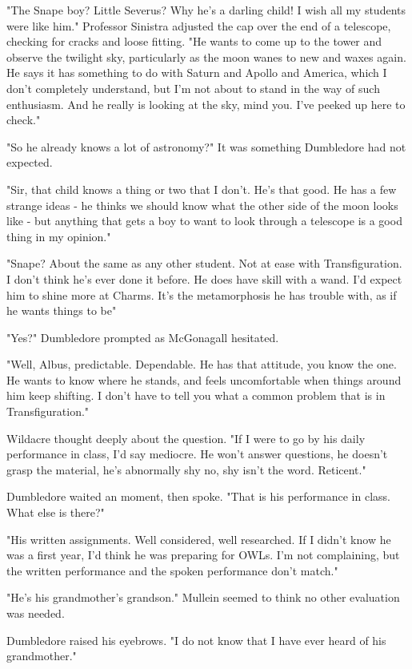 "The Snape boy? Little Severus? Why he's a darling child! I wish all my students were like him." Professor Sinistra adjusted the cap over the end of a telescope, checking for cracks and loose fitting. "He wants to come up to the tower and observe the twilight sky, particularly as the moon wanes to new and waxes again. He says it has something to do with Saturn and Apollo and America, which I don't completely understand, but I'm not about to stand in the way of such enthusiasm. And he really is looking at the sky, mind you. I've peeked up here to check."

"So he already knows a lot of astronomy?" It was something Dumbledore had not expected.

"Sir, that child knows a thing or two that I don't. He's that good. He has a few strange ideas - he thinks we should know what the other side of the moon looks like - but anything that gets a boy to want to look through a telescope is a good thing in my opinion."

"Snape? About the same as any other student. Not at ease with Transfiguration. I don't think he's ever done it before. He does have skill with a wand. I'd expect him to shine more at Charms. It's the metamorphosis he has trouble with, as if he wants things to be{\el}"

"Yes?" Dumbledore prompted as McGonagall hesitated.

"Well, Albus, predictable. Dependable. He has that attitude, you know the one. He wants to know where he stands, and feels uncomfortable when things around him keep shifting. I don't have to tell you what a common problem that is in Transfiguration."

Wildacre thought deeply about the question. "If I were to go by his daily performance in class, I'd say mediocre. He won't answer questions, he doesn't grasp the material, he's abnormally shy{\el} no, shy isn't the word. Reticent."

Dumbledore waited an moment, then spoke. "That is his performance in class. What else is there?"

"His written assignments. Well considered, well researched. If I didn't know he was a first year, I'd think he was preparing for OWLs. I'm not complaining, but the written performance and the spoken performance don't match."

"He's his grandmother's grandson." Mullein seemed to think no other evaluation was needed.

Dumbledore raised his eyebrows. "I do not know that I have ever heard of his grandmother."

